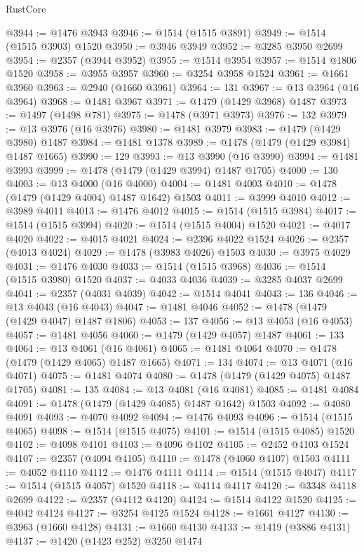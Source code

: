 \begin{lexlean}{RustCore}
\begin{coremodule}
@3944 := @1476 @3943
@3946 := @1514 (@1515 @3891)
@3949 := @1514 (@1515 @3903) @1520
@3950 := @3946 @3949
@3952 := @3285 @3950 @2699
@3954 := @2357 (@3944 @3952)
@3955 := @1514 @3954
@3957 := @1514 @1806 @1520
@3958 := @3955 @3957
@3960 := @3254 @3958 @1524
@3961 := @1661 @3960
@3963 := @2940 (@1660 @3961)
@3964 := 131
@3967 := @13 @3964 (@16 @3964)
@3968 := @1481 @3967
@3971 := @1479 (@1429 @3968) @1487
@3973 := @1497 (@1498 @781)
@3975 := @1478 (@3971 @3973)
@3976 := 132
@3979 := @13 @3976 (@16 @3976)
@3980 := @1481 @3979
@3983 := @1479 (@1429 @3980) @1487
@3984 := @1481 @1378
@3989 := @1478 (@1479 (@1429 @3984) @1487 @1665)
@3990 := 129
@3993 := @13 @3990 (@16 @3990)
@3994 := @1481 @3993
@3999 := @1478 (@1479 (@1429 @3994) @1487 @1705)
@4000 := 130
@4003 := @13 @4000 (@16 @4000)
@4004 := @1481 @4003
@4010 := @1478 (@1479 (@1429 @4004) @1487 @1642) @1503
@4011 := @3999 @4010
@4012 := @3989 @4011
@4013 := @1476 @4012
@4015 := @1514 (@1515 @3984)
@4017 := @1514 (@1515 @3994)
@4020 := @1514 (@1515 @4004) @1520
@4021 := @4017 @4020
@4022 := @4015 @4021
@4024 := @2396 @4022 @1524
@4026 := @2357 (@4013 @4024)
@4029 := @1478 (@3983 @4026) @1503
@4030 := @3975 @4029
@4031 := @1476 @4030
@4033 := @1514 (@1515 @3968)
@4036 := @1514 (@1515 @3980) @1520
@4037 := @4033 @4036
@4039 := @3285 @4037 @2699
@4041 := @2357 (@4031 @4039)
@4042 := @1514 @4041
@4043 := 136
@4046 := @13 @4043 (@16 @4043)
@4047 := @1481 @4046
@4052 := @1478 (@1479 (@1429 @4047) @1487 @1806)
@4053 := 137
@4056 := @13 @4053 (@16 @4053)
@4057 := @1481 @4056
@4060 := @1479 (@1429 @4057) @1487
@4061 := 133
@4064 := @13 @4061 (@16 @4061)
@4065 := @1481 @4064
@4070 := @1478 (@1479 (@1429 @4065) @1487 @1665)
@4071 := 134
@4074 := @13 @4071 (@16 @4071)
@4075 := @1481 @4074
@4080 := @1478 (@1479 (@1429 @4075) @1487 @1705)
@4081 := 135
@4084 := @13 @4081 (@16 @4081)
@4085 := @1481 @4084
@4091 := @1478 (@1479 (@1429 @4085) @1487 @1642) @1503
@4092 := @4080 @4091
@4093 := @4070 @4092
@4094 := @1476 @4093
@4096 := @1514 (@1515 @4065)
@4098 := @1514 (@1515 @4075)
@4101 := @1514 (@1515 @4085) @1520
@4102 := @4098 @4101
@4103 := @4096 @4102
@4105 := @2452 @4103 @1524
@4107 := @2357 (@4094 @4105)
@4110 := @1478 (@4060 @4107) @1503
@4111 := @4052 @4110
@4112 := @1476 @4111
@4114 := @1514 (@1515 @4047)
@4117 := @1514 (@1515 @4057) @1520
@4118 := @4114 @4117
@4120 := @3348 @4118 @2699
@4122 := @2357 (@4112 @4120)
@4124 := @1514 @4122 @1520
@4125 := @4042 @4124
@4127 := @3254 @4125 @1524
@4128 := @1661 @4127
@4130 := @3963 (@1660 @4128)
@4131 := @1660 @4130
@4133 := @1419 (@3886 @4131)
@4137 := @1420 (@1423 @252) @3250 @1474

\end{coremodule}
\end{lexlean}
